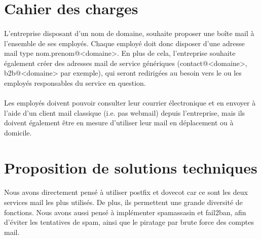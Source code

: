 \documentclass[a4paper,12pt]{article}
\begin{document}

\clearpage

\section{Cahier des charges}
	\paragraph{} L’entreprise disposant d’un nom de domaine, souhaite proposer une boîte
mail à l’ensemble de ses employés. Chaque employé doit donc disposer d’une
adresse mail type nom.prenom@<domaine>. En plus de cela, l’entreprise
souhaite également créer des adresses mail de service génériques (contact@<domaine>,
b2b@<domaine> par exemple), qui seront redirigées au besoin vers le ou les
employés responsables du service en question.
 	\paragraph{} Les employés doivent pouvoir consulter leur courrier électronique et en
envoyer à l’aide d’un client mail classique (i.e. pas webmail) depuis
l’entreprise, mais ils doivent également être en mesure d’utiliser leur mail en
déplacement ou à domicile.
		
	
\section{Proposition de solutions techniques}
	\paragraph{} Nous avons directement pensé à utiliser postfix et dovecot car ce sont les deux services mail les plus utilisés. De plus, ils permettent une grande diversité de fonctions. Nous avons aussi pensé à implémenter spamassasin et fail2ban, afin d'éviter les tentatives de spam, ainsi que le piratage par brute force des comptes mail.
\end{document}
